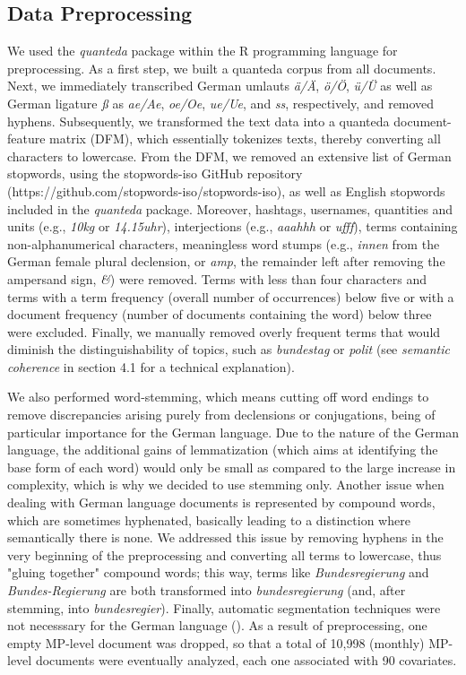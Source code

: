 \subsection{Data Preprocessing}

We used the \textit{quanteda} package within the R programming language for preprocessing. As a first step, we built a quanteda corpus from all documents. Next, we immediately transcribed German umlauts \textit{ä/Ä}, \textit{ö/Ö}, \textit{ü/Ü} as well as German ligature \textit{ß} as \textit{ae/Ae}, \textit{oe/Oe}, \textit{ue/Ue}, and \textit{ss}, respectively, and removed hyphens. Subsequently, we transformed the text data into a quanteda document-feature matrix (DFM), which essentially tokenizes texts, thereby converting all characters to lowercase. From the DFM, we removed an extensive list of German stopwords, using the stopwords-iso GitHub repository (https://github.com/stopwords-iso/stopwords-iso), as well as English stopwords included in the \textit{quanteda} package. Moreover, hashtags, usernames, quantities and units (e.g., \textit{10kg} or \textit{14.15uhr}), interjections (e.g., \textit{aaahhh} or \textit{ufff}), terms containing non-alphanumerical characters, meaningless word stumps (e.g., \textit{innen} from the German female plural declension, or \textit{amp}, the remainder left after removing the ampersand sign, \textit{\&}) were removed. Terms with less than four characters and terms with a term frequency (overall number of occurrences) below five or with a document frequency (number of documents containing the word) below three were excluded. Finally, we manually removed overly frequent terms that would diminish the distinguishability of topics, such as \textit{bundestag} or \textit{polit} (see \textit{semantic coherence} in section 4.1 for a technical explanation).

We also performed word-stemming, which means cutting off word endings to remove discrepancies arising purely from declensions or conjugations, being of particular importance for the German language. Due to the nature of the German language, the additional gains of lemmatization (which aims at identifying the base form of each word) would only be small as compared to the large increase in complexity, which is why we decided to use stemming only. Another issue when dealing with German language documents is represented by compound words, which are sometimes hyphenated, basically leading to a distinction where semantically there is none. We addressed this issue by removing hyphens in the very beginning of the preprocessing and converting all terms to lowercase, thus "gluing together" compound words; this way, terms like \textit{Bundesregierung} and \textit{Bundes-Regierung} are both transformed into \textit{bundesregierung} (and, after stemming, into \textit{bundesregier}). Finally, automatic segmentation techniques were not necesssary for the German language (\citealp{lucas2015computer}). As a result of preprocessing, one empty MP-level document was dropped, so that a total of 10,998 (monthly) MP-level documents were eventually analyzed, each one associated with 90 covariates.
